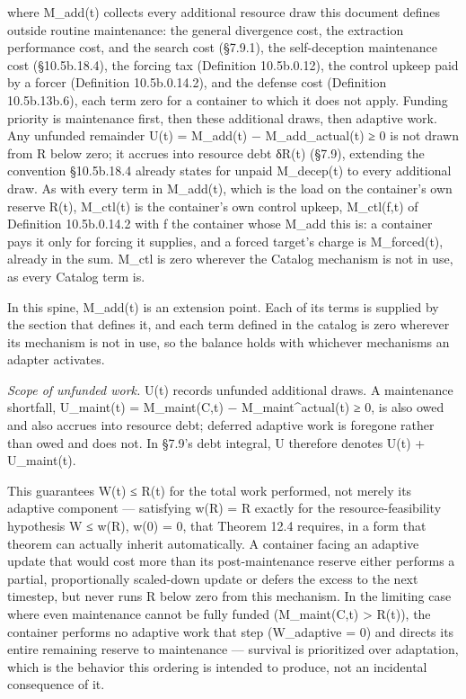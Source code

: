 \documentclass[
]{article}
\begin{document}
where M\_add(t) collects every additional resource draw this document
defines outside routine maintenance: the general divergence cost, the
extraction performance cost, and the search cost (§7.9.1), the
self-deception maintenance cost (§10.5b.18.4), the forcing tax
(Definition 10.5b.0.12), the control upkeep paid by a forcer (Definition
10.5b.0.14.2), and the defense cost (Definition 10.5b.13b.6), each term
zero for a container to which it does not apply. Funding priority is
maintenance first, then these additional draws, then adaptive work. Any
unfunded remainder U(t) = M\_add(t) − M\_add\_actual(t) ≥ 0 is not drawn
from R below zero; it accrues into resource debt δR(t) (§7.9), extending
the convention §10.5b.18.4 already states for unpaid M\_decep(t) to
every additional draw. As with every term in M\_add(t), which is the
load on the container's own reserve R(t), M\_ctl(t) is the container's
own control upkeep, M\_ctl(f,t) of Definition 10.5b.0.14.2 with f the
container whose M\_add this is: a container pays it only for forcing it
supplies, and a forced target's charge is M\_forced(t), already in the
sum. M\_ctl is zero wherever the Catalog mechanism is not in use, as
every Catalog term is.

In this spine, M\_add(t) is an extension point. Each of its terms is
supplied by the section that defines it, and each term defined in the
catalog is zero wherever its mechanism is not in use, so the balance
holds with whichever mechanisms an adapter activates.

\emph{Scope of unfunded work.} U(t) records unfunded additional draws. A
maintenance shortfall, U\_maint(t) = M\_maint(C,t) −
M\_maint\^{}actual(t) ≥ 0, is also owed and also accrues into resource
debt; deferred adaptive work is foregone rather than owed and does not.
In §7.9's debt integral, U therefore denotes U(t) + U\_maint(t).

This guarantees W(t) ≤ R(t) for the total work performed, not merely its
adaptive component --- satisfying w(R) = R exactly for the
resource-feasibility hypothesis W ≤ w(R), w(0) = 0, that Theorem 12.4
requires, in a form that theorem can actually inherit automatically. A
container facing an adaptive update that would cost more than its
post-maintenance reserve either performs a partial, proportionally
scaled-down update or defers the excess to the next timestep, but never
runs R below zero from this mechanism. In the limiting case where even
maintenance cannot be fully funded (M\_maint(C,t) \textgreater{} R(t)),
the container performs no adaptive work that step (W\_adaptive = 0) and
directs its entire remaining reserve to maintenance --- survival is
prioritized over adaptation, which is the behavior this ordering is
intended to produce, not an incidental consequence of it.
\end{document}
